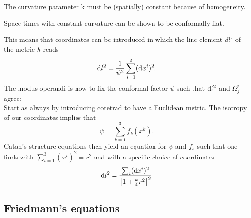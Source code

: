The curvature parameter k must be (spatially) constant because of homogeneity.
\begin{statements}
	Space-times with constant curvature can be shown to be
	conformally flat.
\end{statements}
This means that coordinates can be introduced in
which the line element $dl^2$ of the metric $h$ reads
\begin{equation}
\mathrm{d} l^2 = \frac{1}{\psi^2} \sum_{i=1}^{3} (\mathrm{d} x^i)^2.
\end{equation}
The modus operandi is now to fix the conformal factor $\psi$ such that $\mathrm{d} l^2$ and $\Omega^i_j$ agree: \\
Start as always by introducing cotetrad to have a Euclidean metric.  The isotropy of our coordinates implies that
\begin{equation}
\psi = \sum_{k=1}^{3} f_k(x^k).
\end{equation}
Catan's structure equations then yield an equation for $\psi$ and $f_k$ such that one finds with $\sum_{i=1}^{3} (x^i)^2=r^2$ and with a specific choice of coordinates
\begin{equation}
\mathrm{d} l^2 = \frac{\sum_i (\mathrm{d} x^i)^2}{\left[1+\frac{k}{4} r^2\right]^2}
\end{equation}
\subsection{Friedmann's equations}
